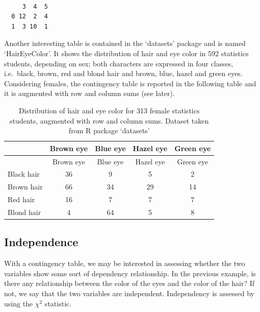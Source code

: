 \documentclass[
  letterpaper,
  DIV=11,
  numbers=noendperiod]{scrreprt}
\newenvironment{Shaded}{\begin{snugshade}}{\end{snugshade}}
\newcommand{\FunctionTok}[1]{\textcolor[rgb]{0.28,0.35,0.67}{#1}}
\newcommand{\NormalTok}[1]{\textcolor[rgb]{0.00,0.23,0.31}{#1}}
\newcommand{\SpecialCharTok}[1]{\textcolor[rgb]{0.37,0.37,0.37}{#1}}
\begin{document}
\begin{Shaded}
\end{Shaded}

\begin{verbatim}
   
     3  4  5
  0 12  2  4
  1  3 10  1
\end{verbatim}

Another interesting table is contained in the `datasets' package and is
named `HairEyeColor'. It shows the distribution of hair and eye color in
592 statistics students, depending on sex; both characters are expressed
in four classes, i.e.~black, brown, red and blond hair and brown, blue,
hazel and green eyes. Considering females, the contingency table is
reported in the following table and it is augmented with row and column
sums (see later).

\begin{longtable}[]{@{}lcccc@{}}
\caption{Distribution of hair and eye color for 313 female statistics
students, augmented with row and column sums. Dataset taken from R
package `datasets'}\tabularnewline
\toprule\noalign{}
& Brown eye & Blue eye & Hazel eye & Green eye \\
\midrule\noalign{}
\endfirsthead
\toprule\noalign{}
& Brown eye & Blue eye & Hazel eye & Green eye \\
\midrule\noalign{}
\endhead
\bottomrule\noalign{}
\endlastfoot
Black hair & 36 & 9 & 5 & 2 \\
Brown hair & 66 & 34 & 29 & 14 \\
Red hair & 16 & 7 & 7 & 7 \\
Blond hair & 4 & 64 & 5 & 8 \\
\end{longtable}

\subsection{Independence}\label{independence}

With a contingency table, we may be interested in assessing whether the
two variables show some sort of dependency relationship. In the previous
example, is there any relationship between the color of the eyes and the
color of the hair? If not, we say that the two variables are
independent. Independency is assessed by using the \(\chi^2\) statistic.
\end{document}
